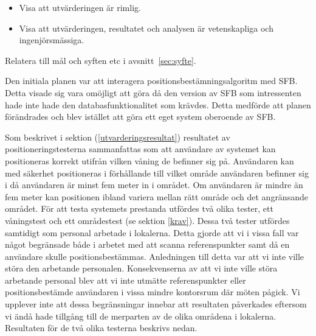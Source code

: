 \documentclass[a4paper,12pt]{article}
\begin{document}
 \begin{itemize}
 \item Visa att utvärderingen är rimlig.
 \item Visa att utvärderingen, resultatet och analysen är vetenskapliga och ingenjörsmässiga.
 \end{itemize}

 Relatera till mål och syften etc i avsnitt~\ref{sec:syfte}.
 \fi

 Den initiala planen var att interagera positionsbestämningsalgoritm med SFB. Detta visade sig vara omöjligt att göra då den version av SFB som intressenten hade inte hade den databasfunktionalitet som krävdes. Detta medförde att planen förändrades och blev istället att göra ett eget system oberoende av SFB.

 Som beskrivet i sektion (\ref{utvarderingsresultat}) resultatet av positioneringstesterna sammanfattas som att användare av systemet kan positioneras korrekt utifrån vilken våning de befinner sig på. Användaren kan med säkerhet positioneras i förhållande till vilket område användaren befinner sig i då användaren är minst fem meter in i området. Om användaren är mindre än fem meter kan positionen ibland variera mellan rätt område och det angränsande området.
 För att testa systemets prestanda utfördes två olika tester, ett våningstest och ett områdestest (se sektion \ref{krav}). Dessa två tester utfördes samtidigt som personal arbetade i lokalerna. Detta gjorde att vi i vissa fall var något begränsade både i arbetet med att scanna referenspunkter samt då en användare skulle positionsbestämmas. Anledningen till detta var att vi inte ville störa den arbetande personalen. Konsekvenserna av att vi inte ville störa arbetande personal blev att vi inte utmätte referenspunkter eller positionsbestämde användaren i vissa mindre kontorsrum där möten pågick. Vi upplever inte att dessa begränsningar innebar att resultaten påverkades eftersom vi ändå hade tillgång till de merparten av de olika områdena i lokalerna. Resultaten för de två olika testerna beskrivs nedan.
\end{document}
